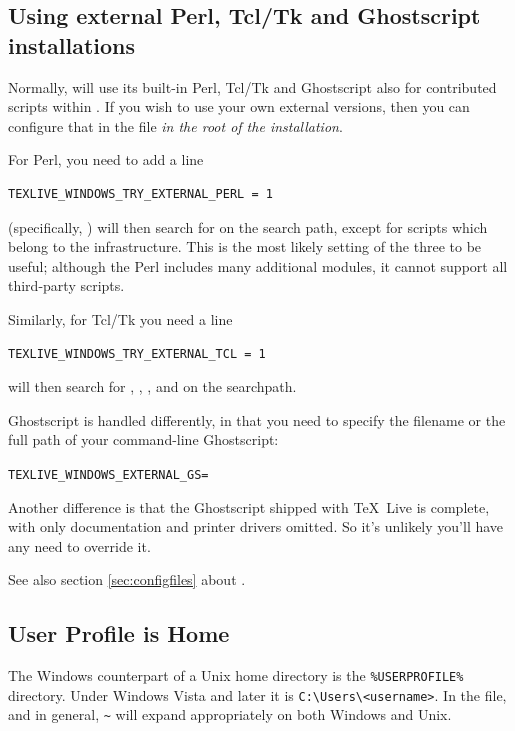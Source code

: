 \documentclass{article}
\begin{document}
\subsection{Using external Perl, Tcl/Tk and Ghostscript
  installations}
\label{sec:externalwndws}

Normally, \TL{} will use its built-in Perl, Tcl/Tk and Ghostscript also
for contributed scripts within \TL. If you wish to use your own external
versions, then you can configure that in the  file
\emph{in the root of the installation}.

For Perl, you need to add a line
\begin{verbatim}
TEXLIVE_WINDOWS_TRY_EXTERNAL_PERL = 1
\end{verbatim}
\TL{} (specifically, ) will then search
for  on the search path, except for scripts which belong
to the \TL{} infrastructure. This is the most likely setting of the
three to be useful; although the \TL{} Perl includes many additional
modules, it cannot support all third-party scripts.

Similarly, for Tcl/Tk you need a line
\begin{verbatim}
TEXLIVE_WINDOWS_TRY_EXTERNAL_TCL = 1
\end{verbatim}
\TL{} will then search for , ,
,  and  on the
searchpath.

Ghostscript is handled differently, in that you need to specify the
filename or the full path of your command-line Ghostscript:
\begin{alltt}
TEXLIVE_WINDOWS_EXTERNAL_GS = 
\end{alltt}
Another difference is that the Ghostscript shipped with \TeX\ Live
is complete, with only documentation and printer drivers omitted.  So
it's unlikely you'll have any need to override it.

See also section \ref{sec:configfiles} about .


\subsection{User Profile is Home}
\label{sec:winhome}

The Windows counterpart of a Unix home directory is the
\verb|%USERPROFILE%| directory.  Under Windows Vista and later it is
\verb|C:\Users\<username>|.  In the
 file, and \KPS{} in general, \verb|~| will
expand appropriately on both Windows and Unix.
\end{document}

